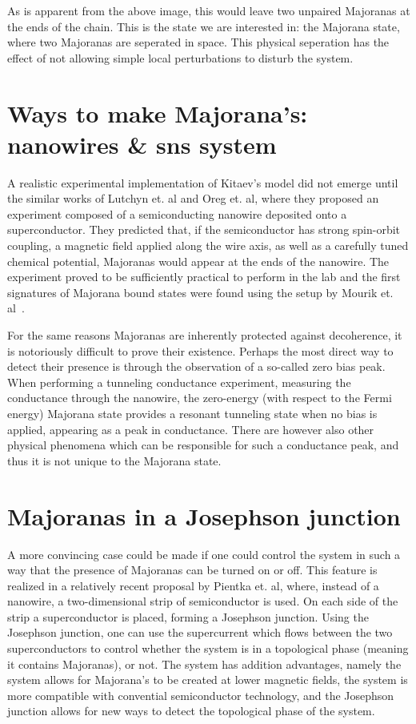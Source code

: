 	As is apparent from the above image, this would leave two unpaired Majoranas at the ends of the chain.
	This is the state we are interested in: the Majorana state, where two Majoranas are seperated in space.
	This physical seperation has the effect of not allowing simple local perturbations to disturb the system.

\section{Ways to make Majorana's: nanowires \& sns system}
	A realistic experimental implementation of Kitaev's model did not emerge until the similar works of Lutchyn et. al\cite{lutchyn_majorana_2010} and Oreg et. al\cite{ oreg_helical_2010}, where they proposed an experiment composed of a semiconducting nanowire deposited onto a superconductor.
	They predicted that, if the semiconductor has strong spin-orbit coupling, a magnetic field applied along the wire axis, as well as a carefully tuned chemical potential, Majoranas would appear at the ends of the nanowire.
	The experiment proved to be sufficiently practical to perform in the lab and the first signatures of Majorana bound states were found using the setup by Mourik et. al~\cite{mourik_signatures_2012}.

	For the same reasons Majoranas are inherently protected against decoherence, it is notoriously difficult to prove their existence.
	Perhaps the most direct way to detect their presence is through the observation of a so-called zero bias peak.
	When performing a tunneling conductance experiment, measuring the conductance through the nanowire, the zero-energy (with respect to the Fermi energy) Majorana state provides a resonant tunneling state when no bias is applied, appearing as a peak in conductance.
	There are however also other physical phenomena which can be responsible for such a conductance peak, and thus it is not unique to the Majorana state.

\section{Majoranas in a Josephson junction}
	A more convincing case could be made if one could control the system in such a way that the presence of Majoranas can be turned on or off.
	This feature is realized in a relatively recent proposal by Pientka et. al\cite{pientka_topological_2017}, where, instead of a nanowire, a two-dimensional strip of semiconductor is used.
	On each side of the strip a superconductor is placed, forming a Josephson junction.
	Using the Josephson junction, one can use the supercurrent which flows between the two superconductors to control whether the system is in a topological phase (meaning it contains Majoranas), or not.
	The system has addition advantages, namely the system allows for Majorana's to be created at lower magnetic fields, the system is more compatible with convential semiconductor technology, and the Josephson junction allows for new ways to detect the topological phase of the system.

